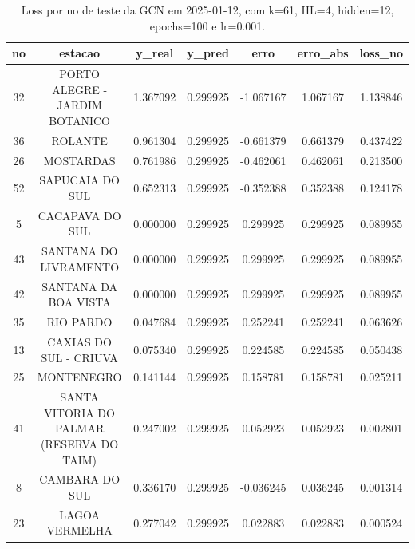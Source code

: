 \begin{table}[h]
\centering
\caption{Loss por no de teste da GCN em 2025-01-12, com k=61, HL=4, hidden=12, epochs=100 e lr=0.001.}
\label{tab:gcn_loss_k61_hl4_h12_e100_d20250112}
\begin{tabular}{ccccccc}
\toprule
no & estacao & y\_real & y\_pred & erro & erro\_abs & loss\_no \\
\midrule
32 & PORTO ALEGRE - JARDIM BOTANICO & 1.367092 & 0.299925 & -1.067167 & 1.067167 & 1.138846 \\
36 & ROLANTE & 0.961304 & 0.299925 & -0.661379 & 0.661379 & 0.437422 \\
26 & MOSTARDAS & 0.761986 & 0.299925 & -0.462061 & 0.462061 & 0.213500 \\
52 & SAPUCAIA DO SUL & 0.652313 & 0.299925 & -0.352388 & 0.352388 & 0.124178 \\
5 & CACAPAVA DO SUL & 0.000000 & 0.299925 & 0.299925 & 0.299925 & 0.089955 \\
43 & SANTANA DO LIVRAMENTO & 0.000000 & 0.299925 & 0.299925 & 0.299925 & 0.089955 \\
42 & SANTANA DA BOA VISTA & 0.000000 & 0.299925 & 0.299925 & 0.299925 & 0.089955 \\
35 & RIO PARDO & 0.047684 & 0.299925 & 0.252241 & 0.252241 & 0.063626 \\
13 & CAXIAS DO SUL - CRIUVA & 0.075340 & 0.299925 & 0.224585 & 0.224585 & 0.050438 \\
25 & MONTENEGRO & 0.141144 & 0.299925 & 0.158781 & 0.158781 & 0.025211 \\
41 & SANTA VITORIA DO PALMAR (RESERVA DO TAIM) & 0.247002 & 0.299925 & 0.052923 & 0.052923 & 0.002801 \\
8 & CAMBARA DO SUL & 0.336170 & 0.299925 & -0.036245 & 0.036245 & 0.001314 \\
23 & LAGOA VERMELHA & 0.277042 & 0.299925 & 0.022883 & 0.022883 & 0.000524 \\
\bottomrule
\end{tabular}
\end{table}
